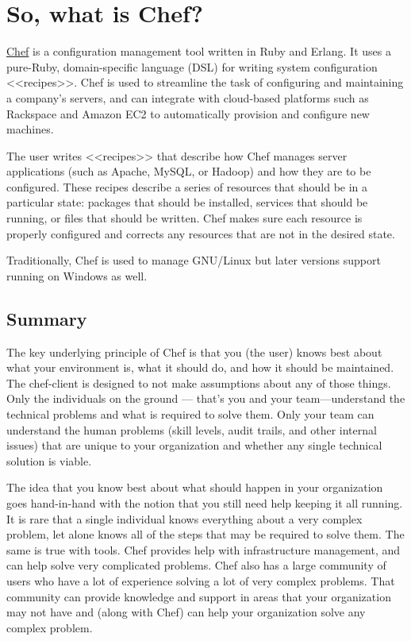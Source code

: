 \chapter{So, what is Chef?}

\begin{figure}[ht!]
  \label{fig:chef_logo}
\end{figure}

\href{http://www.getchef.com/}{Chef} is a configuration management tool written in Ruby and Erlang. It uses a pure-Ruby, domain-specific language (DSL) for writing system configuration <<recipes>>. Chef is used to streamline the task of configuring and maintaining a company's servers, and can integrate with cloud-based platforms such as Rackspace and Amazon EC2 to automatically provision and configure new machines.

The user writes <<recipes>> that describe how Chef manages server applications (such as Apache, MySQL, or Hadoop) and how they are to be configured. These recipes describe a series of resources that should be in a particular state: packages that should be installed, services that should be running, or files that should be written. Chef makes sure each resource is properly configured and corrects any resources that are not in the desired state.

Traditionally, Chef is used to manage GNU/Linux but later versions support running on Windows as well.




\section{Summary}

The key underlying principle of Chef is that you (the user) knows best about what your environment is, what it should do, and how it should be maintained. The chef-client is designed to not make assumptions about any of those things. Only the individuals on the ground — that's you and your team—understand the technical problems and what is required to solve them. Only your team can understand the human problems (skill levels, audit trails, and other internal issues) that are unique to your organization and whether any single technical solution is viable.

The idea that you know best about what should happen in your organization goes hand-in-hand with the notion that you still need help keeping it all running. It is rare that a single individual knows everything about a very complex problem, let alone knows all of the steps that may be required to solve them. The same is true with tools. Chef provides help with infrastructure management, and can help solve very complicated problems. Chef also has a large community of users who have a lot of experience solving a lot of very complex problems. That community can provide knowledge and support in areas that your organization may not have and (along with Chef) can help your organization solve any complex problem.
